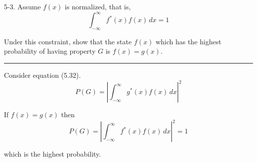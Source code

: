 \documentclass[12pt]{article}
\begin{document}
5-3. Assume $f(x)$ is normalized, that is,
\begin{equation*}
\int_{-\infty}^\infty f^*(x)f(x)\,dx=1
\end{equation*}

Under this constraint, show that the state $f(x)$ which has the
highest probability of having property $G$ is $f(x)=g(x)$.

\bigskip
\hrule

\bigskip
Consider equation (5.32).
\begin{equation*}
P(G)=\left|\int_{-\infty}^\infty g^*(x)f(x)\,dx\right|^2
\tag{5.32}
\end{equation*}

If $f(x)=g(x)$ then
\begin{equation*}
P(G)=\left|\int_{-\infty}^\infty f^*(x)f(x)\,dx\right|^2=1
\end{equation*}

which is the highest probability.
\end{document}
